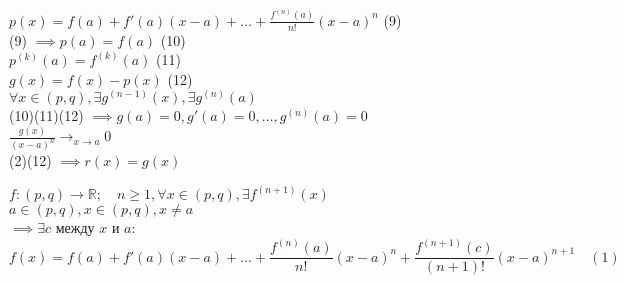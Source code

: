 \begin{replacementproof}
	$p(x)=f(a)+f'(a)(x-a)+\ldots+\displaystyle\frac{f^{(n)}(a)}{n!}(x-a)^{n}$ (9)\\
	(9) $\implies p(a)=f(a)$ (10) \\$p^{(k)}(a)=f^{(k)}(a)$ (11)\\
	$g(x)=f(x)-p(x)$ (12)\\
	$\forall x \in (p,q), \exists g^{(n-1)}(x), \exists g^{(n)}(a)$ \\
	(10)(11)(12) $\implies g(a)=0, g'(a)=0,\ldots,g^{(n)}(a)=0$\\
	$\displaystyle\frac{g(x)}{(x-a)^{n}} \to_{x\to a} 0$ \\
	(2)(12) $\implies r(x)=g(x)$
\end{replacementproof}


\begin{theorem}
	$f:(p,q) \to \mathbb{R}; \quad n\ge 1, \forall x \in (p,q), \exists f^{(n+1)}(x)$\\
	$a \in (p,q), x \in (p,q), x \neq a$ \\
	$\implies \exists c$ между $x$ и $a:$
	 \[
	f(x)=f(a)+f'(a)(x-a)+\ldots+\displaystyle\frac{f^{(n)}(a)}{n!}(x-a)^{n}+\displaystyle\frac{f^{(n+1)}(c)}{(n+1)!}(x-a)^{n+1} \quad (1)
	\] 
\end{theorem}

